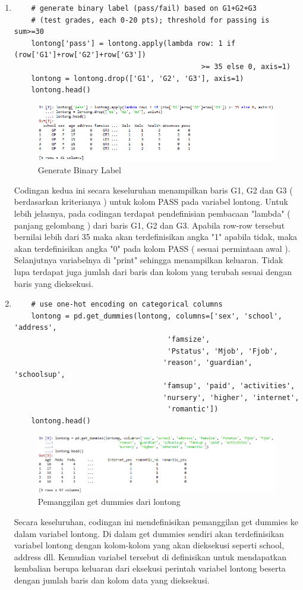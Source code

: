 \begin{enumerate}
\item
\begin{verbatim}
	# generate binary label (pass/fail) based on G1+G2+G3 
	# (test grades, each 0-20 pts); threshold for passing is sum>=30
	lontong['pass'] = lontong.apply(lambda row: 1 if (row['G1']+row['G2']+row['G3']) 
											>= 35 else 0, axis=1)
	lontong = lontong.drop(['G1', 'G2', 'G3'], axis=1)
	lontong.head()
\end{verbatim}
\begin{figure}[ht]
\centering
\includegraphics[scale=0.6]{figures/lontong/2.png}
\caption{Generate Binary Label}
\end{figure}
\par
	Codingan kedua ini secara keseluruhan menampilkan  baris  G1, G2 dan G3 ( berdasarkan kriterianya ) untuk kolom PASS pada variabel lontong. Untuk lebih jelasnya, pada codingan terdapat pendefinisian pembacaan "lambda" ( panjang gelombang ) dari baris G1, G2 dan G3. Apabila row-row tersebut bernilai lebih dari 35 maka akan terdefinisikan angka "1" apabila tidak, maka akan terdefinisikan angka "0" pada kolom PASS ( sesuai permintaan awal ). Selanjutnya variabelnya di "print" sehingga menampilkan keluaran. Tidak lupa terdapat juga jumlah dari baris dan kolom yang terubah sesuai dengan baris yang dieksekusi.


\item
\begin{verbatim}
	# use one-hot encoding on categorical columns
	lontong = pd.get_dummies(lontong, columns=['sex', 'school', 'address', 
									'famsize', 
									'Pstatus', 'Mjob', 'Fjob', 
	                               'reason', 'guardian', 'schoolsup', 
								   'famsup', 'paid', 'activities',
	                               'nursery', 'higher', 'internet', 
									'romantic'])
	lontong.head()
\end{verbatim}
\begin{figure}[ht]
\centering
\includegraphics[scale=0.6]{figures/lontong/3.png}
\caption{Pemanggilan get dummies dari lontong}
\end{figure}
\par
	Secara keseluruhan, codingan ini mendefinisikan pemanggilan get dummies ke dalam variabel lontong. Di dalam get dummies sendiri akan terdefinisikan variabel lontong dengan kolom-kolom yang akan dieksekusi seperti school, address dll. Kemudian variabel tersebut di definisikan untuk mendapatkan kembalian berupa keluaran dari eksekusi perintah variabel lontong beserta dengan jumlah baris dan kolom data yang dieksekusi.


\end{enumerate}
